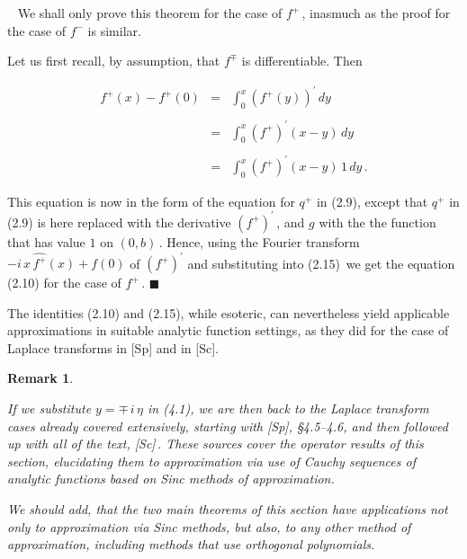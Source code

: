 \documentclass[11pt]{article}
\newtheorem{remark}[Theorem]{Remark}
\newenvironment{Remark}{\begin{remark}\rm}{\end{remark}}
\newenvironment{Proof}
{\bigskip\noindent{\bf Proof.}~\rm}{\bigskip}
\begin{document}
 \begin{Proof} We shall only prove this theorem for the case of
   $f^+$\,, inasmuch as the proof for the case of $f^-$ is similar.

 \vspace{.1in} \noindent Let us first recall, by assumption, that $f^\mp$ is
 differentiable.  Then
 
 \begin{equation}%
   \begin{array}{rcl}
     f^+(x) - f^+(0) & = & \displaystyle \int_0^x \left(f^+(y)\right)^\prime\,dy
     \\
     && \\
     & = & \displaystyle \int_0^x \left(f^+\right)^\prime(x-y)\,dy \\
     && \\
     & = & \displaystyle \int_0^x \left(f^+\right)^\prime(x-y)\,1\,dy\,. 
   \end{array}
   \label{equation:2.15}
 \end{equation}

 \noindent This equation is now in the form of the equation for $q^+$
 in (2.9), except that $q^+$ in (2.9) is here replaced with the
 derivative $\left(f^+\right)^\prime$\,, and $g$ with the the function
 that has value $1$ on $(0,b)$\,.  Hence, using the Fourier
 transform $- i\,x\,\widehat{f^+}(x) + f(0)$ of
 $\left(f^+\right)^\prime$ and substituting into (2.15)\, we get the
 equation (2.10) for the case of $f^+$\,.
  \end{Proof} $\blacksquare$

 \vspace{.2in} \noindent The identities (2.10) and (2.15), while
 esoteric, can nevertheless yield applicable approximations in
 suitable analytic function settings, as they did for the case of
 Laplace transforms in [Sp] and in [Sc].

 \begin{Remark}
   \label{remark:2.7}

   If we substitute $y = \mp\,i\,\eta$ in (4.1), we are then back to
   the Laplace transform cases already covered extensively, starting
   with [Sp], \S4.5--4.6, and then followed up with all of the text,
   [Sc]\,. These sources cover the operator results of this section,
   elucidating them to approximation via use of Cauchy sequences of
   analytic functions based on Sinc methods of approximation.
   
   \vspace{.2in} \noindent We should add, that the two main theorems
   of this section have applications not only to approximation via
   Sinc methods, but also, to any other method of approximation,
   including methods that use orthogonal polynomials.

 \end{Remark}
\end{document}
